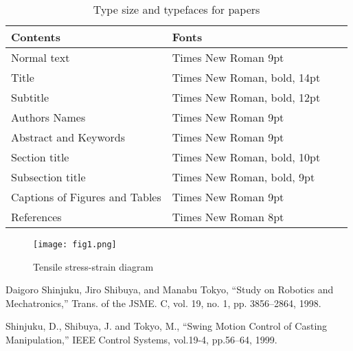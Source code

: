 \documentclass[a4paper]{article}
\begin{document}
\begin{table}[tb]
 \caption{Type size and typefaces for papers}
 \label{tbl: table1}
 \centering
 \footnotesize
 \begin{tabular}{|p{35mm}|l|l|l|}
  \hline
	Contents	&Fonts \\\hline
	Normal text	&Times New Roman 9pt \\\hline
	Title	&Times New Roman, bold, 14pt \\\hline
	Subtitle	&Times New Roman, bold, 12pt \\\hline
	Authors Names	&Times New Roman 9pt \\\hline
	Abstract and Keywords	&Times New Roman 9pt \\\hline
	Section title		&Times New Roman, bold, 10pt \\\hline
	Subsection title		&Times New Roman, bold, 9pt \\\hline
	Captions of Figures and Tables	 &Times New Roman 9pt \\\hline
	References		&Times New Roman 8pt \\
  \hline
 \end{tabular}
\end{table}

\begin{figure}[tbh]
 \centering
  \texttt{[image: fig1.png]}
  \vspace*{-4mm}
  \caption{Tensile stress-strain diagram}
  \label{fig: fig1}
\end{figure}

\footnotesize
\begin{thebibliography}{99}

Daigoro Shinjuku, Jiro Shibuya, and Manabu Tokyo, ``Study on Robotics and Mechatronics,'' Trans. of the JSME. C, vol. 19, no. 1, pp. 3856--2864, 1998.


Shinjuku, D., Shibuya, J. and Tokyo, M., ``Swing Motion Control of Casting Manipulation,'' IEEE Control Systems, vol.19-4, pp.56--64, 1999.

\end{thebibliography}

\normalsize
\end{document}
